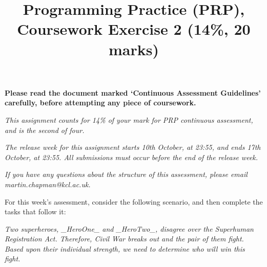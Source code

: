 \documentclass[11pt]{article}
\title{Programming Practice (PRP), Coursework Exercise 2 (14\%, 20 marks)}
\date{}                                           %
\begin{document}
\maketitle

\textbf{Please read the document marked `Continuous Assessment Guidelines' carefully, before attempting any piece of coursework.}

\emph{This assignment counts for 14\% of your mark for PRP continuous assessment, and is the second of four.}

\emph{The release week for this assignment starts 10th October, at 23:55, and ends 17th October, at 23:55. All submissions must occur before the end of the release week.}

\emph{If you have any questions about the structure of this assessment, please email \\ martin.chapman@kcl.ac.uk.}

For this week's assessment, consider the following scenario, and then complete the tasks that follow it:

\emph{Two superheroes, \_HeroOne\_ and \_HeroTwo\_, disagree over the Superhuman Registration Act. Therefore, Civil War breaks out and the pair of them fight. Based upon their individual strength, we need to determine who will win this fight.}
\end{document}
